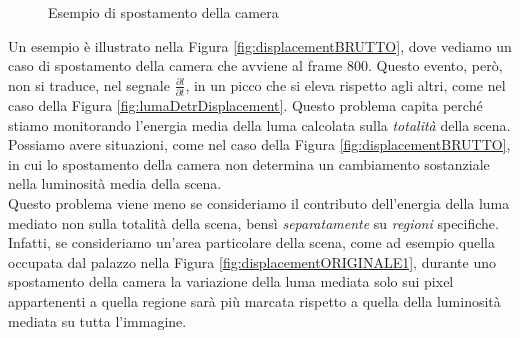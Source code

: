 \begin{figure}[tb]
	\centering
	\caption{Esempio di spostamento della camera}
	\label{fig:testiDISPLACEMENT1}
\end{figure}
Un esempio \`e illustrato nella Figura \ref{fig:displacementBRUTTO}, dove vediamo un caso di spostamento della camera che avviene al frame $800$.
Questo evento, per\`o, non si traduce, nel segnale $\frac{\partial l}{\partial t}$, in un picco che si eleva rispetto agli altri, come nel caso della Figura \ref{fig:lumaDetrDisplacement}.
Questo problema capita perch\'e stiamo monitorando l'energia media della luma calcolata sulla \textit{totalit\`a} della scena.
Possiamo avere situazioni, come nel caso della Figura \ref{fig:displacementBRUTTO}, in cui lo spostamento della camera non determina un cambiamento sostanziale nella luminosit\`a media della scena.\\
Questo problema viene meno se consideriamo il contributo dell'energia della luma mediato non sulla totalit\`a della scena, bens\`i \textit{separatamente} su \textit{regioni} specifiche.
Infatti, se consideriamo un'area particolare della scena, come ad esempio quella occupata dal palazzo nella Figura \ref{fig:displacementORIGINALE1}, durante uno spostamento della camera la variazione della luma mediata solo sui pixel appartenenti a quella regione sar\`a pi\`u marcata rispetto a quella della luminosit\`a mediata su tutta l'immagine.
